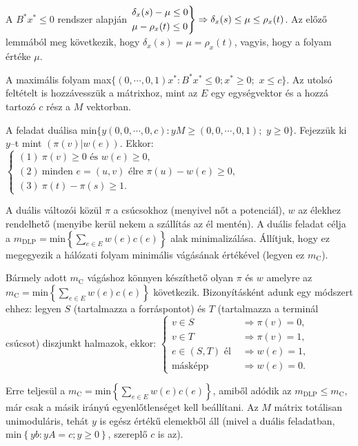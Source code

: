 A $B^*x^* \leq 0$ rendszer alapján $\begin{rcases} \delta_x(s)-\mu \leq 0 \\
\mu - \rho_x(t) \leq 0 \end{rcases} \Rightarrow \delta_x(s) \leq \mu \leq
\rho_x(t)$. Az előző lemmából meg következik, hogy $\delta_x(s)=\mu=\rho_x(t)$,
vagyis, hogy a folyam értéke $\mu$.

A maximális folyam max$\{ (0, \cdots,0,1)x^* : B^*x^* \leq 0; x^* \geq 0;$ $x
\leq c \}$. Az utolsó feltételt is hozzávesszük a mátrixhoz, mint az $E$ egy
egységvektor és a hozzá tartozó $c$ rész a $M$ vektorban.

A feladat duálisa min$\{ y(0, 0, \cdots, 0, c) :yM \geq (0, 0, \cdots, 0, 1);$
$y \geq 0 \}$. Fejezzük ki $y$--t mint $\left( \pi\left(v\right) |
w\left(e\right)\right)$.
Ekkor: $\begin{cases}
(1)~\pi(v) \geq 0 \mbox{ és } w(e) \geq 0, \\
(2)~\mbox{minden } e = (u,v) \mbox{ élre }  \pi(u)-w(e) \geq 0, \\
(3)~\pi(t)-\pi(s) \geq 1. \end{cases}$

A duális változói közül $\pi$ a csúcsokhoz (menyivel nőt a potenciál), $w$ az
élekhez rendelhető (menyibe kerül nekem a szállítás az él mentén). A duális
feladat célja a $m_{\text{DLP}}= \mbox{min} \left\{ \sum_{e\in E}^{}
w(e)c(e)\right\}$ alak minimalizálása. Állítjuk, hogy ez megegyezik a hálózati
folyam minimális vágásának értékével (legyen ez $m_{\text{C}}$).

Bármely adott $m_{\mbox{C}}$ vágáshoz könnyen készíthető olyan $\pi$ és $w$
amelyre az $m_{\text{C}}= \mbox{min} \left\{ \sum_{e\in E}^{} w(e)c(e)\right\}$
következik. Bizonyításként adunk egy módszert ehhez: legyen $S$ (tartalmazza a
forráspontot) és $T$ (tartalmazza a terminál csúcsot) diszjunkt halmazok, ekkor:
$\begin{cases}
v \in S &\Rightarrow \pi(v)=0, \\
v \in T &\Rightarrow \pi(v)=1, \\
e \in (S,T) \mbox{ él } &\Rightarrow w(e)=1, \\
\mbox{másképp} &\Rightarrow w(e)=0.
\end{cases}$

Erre teljesül a $m_{\text{C}}= \mbox{min} \left\{ \sum_{e\in E}^{}
w(e)c(e)\right\}$, amiből adódik az $m_{\mbox{DLP}} \leq m_{\mbox{C}}$, már csak
a másik irányú egyenlőtlenséget kell beállítani. Az $M$ mátrix totálisan
unimoduláris, tehát $y$ is egész értékű elemekből áll (mivel a duális
feladatban, min$\left\{ yb:yA=c; y\geq 0 \right\}$, szereplő $c$ is az).

